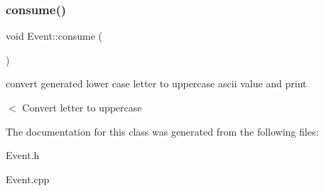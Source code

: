 \subsubsection{\texorpdfstring{consume()}{consume()}}
{\footnotesize\ttfamily void Event\+::consume (\begin{DoxyParamCaption}{ }\end{DoxyParamCaption})}



convert generated lower case letter to uppercase ascii value and print 

$<$ Convert letter to uppercase 

The documentation for this class was generated from the following files\+:\begin{DoxyCompactItemize}
\item 
Event.\+h\item 
Event.\+cpp\end{DoxyCompactItemize}

